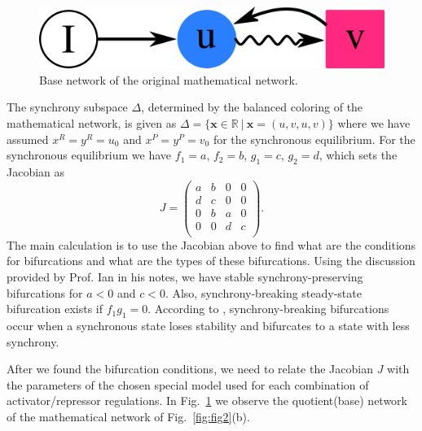 \documentclass[12pt]{article}
\begin{document}
\begin{figure}[H]
    \centering
    \includegraphics[scale=0.65]{drawings/fig3.png}
    \caption{Base network of the original mathematical network.}
    \label{fig:fig3}
\end{figure}

The synchrony subspace $\Delta$, determined by the balanced coloring of the
mathematical network, is given as $\Delta = \{ \bm{x} \in \mathbb{R} \ | \ 
\bm{x} = (u, v, u, v) \}$ where we have assumed $x^R = y^R = u_0$ and 
$x^P = y^P = v_0$ for the synchronous equilibrium. For the synchronous
equilibrium we have $f_1 = a$, $f_2 = b$, $g_1 = c$, $g_2 = d$, which sets 
the Jacobian as 
\begin{equation}
    J = \begin{pmatrix}
        a & b & 0 & 0\\
        d & c & 0 & 0\\
        0 & b & a & 0\\
        0 & 0 & d & c\\
    \end{pmatrix}.
\end{equation}
The main calculation is to use the Jacobian above to find what are the conditions for 
bifurcations and what are the types of these bifurcations. Using the discussion provided 
by Prof. Ian in his notes, we have stable synchrony-preserving bifurcations for $a < 0$ 
and $c < 0$. Also, synchrony-breaking steady-state bifurcation exists if $f_1g_1 = 0$. According to 
\cite{ian_coupled_bifur}, synchrony-breaking bifurcations occur when a synchronous state loses 
stability and bifurcates to a state with less synchrony.

After we found the bifurcation conditions, we need to relate the Jacobian $J$ with 
the parameters of the chosen special model used for each combination of activator/repressor 
regulations. In Fig.~\ref{fig:fig3} we observe the quotient(base) network of the 
mathematical network of Fig.~\ref{fig:fig2}(b).
\end{document}
